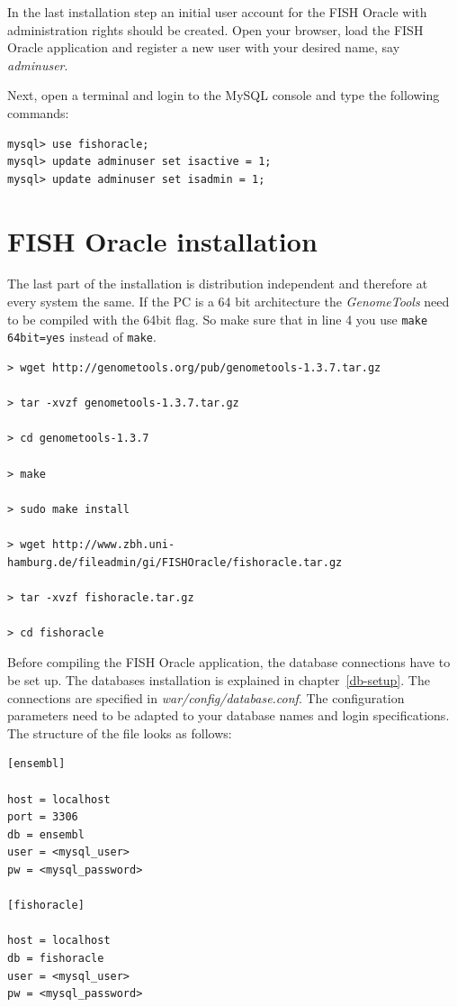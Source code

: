 \documentclass[11pt,final]{article}
\newcommand{\Gt}[0]{\emph{GenomeTools}\xspace}
\begin{document}
In the last installation step an initial user account for the FISH Oracle with
administration rights should be created. Open your browser, load the FISH
Oracle application and register a new user with your desired name, say
\emph{adminuser}. 

Next, open a terminal and login to the MySQL console and type the following
commands:

\begin{lstlisting}
mysql> use fishoracle;
mysql> update adminuser set isactive = 1;
mysql> update adminuser set isadmin = 1;
\end{lstlisting}

\section{FISH Oracle installation}
\label{fo-install}

The last part of the installation is distribution independent
and therefore at every system the same. If the PC is a 64 bit
architecture the \Gt need to be compiled with the 64bit
flag. So make sure that in line 4 you use \texttt{make 64bit=yes}
instead of \texttt{make}.

\begin{lstlisting}
> wget http://genometools.org/pub/genometools-1.3.7.tar.gz

> tar -xvzf genometools-1.3.7.tar.gz

> cd genometools-1.3.7

> make

> sudo make install

> wget http://www.zbh.uni-hamburg.de/fileadmin/gi/FISHOracle/fishoracle.tar.gz

> tar -xvzf fishoracle.tar.gz

> cd fishoracle
\end{lstlisting}

Before compiling the FISH Oracle application, the database connections have
to be set up. The databases installation is explained in
chapter~\ref{db-setup}. The connections are specified in
\textit{war/config/database.conf}. The configuration parameters need to be
adapted to your database names and login specifications. The structure of the
file looks as follows:

\begin{verbatim}
[ensembl]

host = localhost
port = 3306
db = ensembl
user = <mysql_user>
pw = <mysql_password>

[fishoracle]

host = localhost
db = fishoracle
user = <mysql_user>
pw = <mysql_password>
\end{verbatim}
\end{document}
